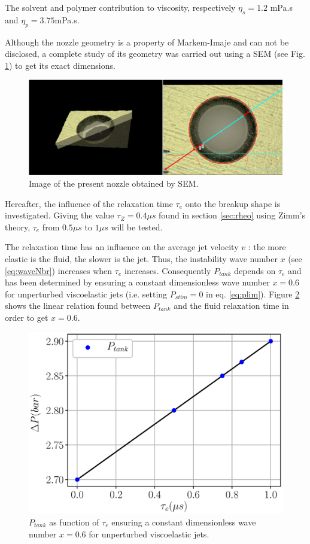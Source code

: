 \documentclass[onecolumn, 12pt]{asme2ej}
\begin{document}
The solvent and polymer contribution to viscosity, respectively $\eta_s = 1.2$ mPa.s and $\eta_p=3.75$mPa.s. 

 
Although the nozzle geometry is a property of {Markem-Imaje\textcopyright}  and can not be disclosed, a complete study of its geometry was carried out using a SEM (see Fig. \ref{fig:micro}) to get its exact dimensions.

\begin{figure}[h]
    \centering
\includegraphics[width=15cm]{Figures/Fig11.eps}
\caption{Image of the present nozzle obtained by SEM.}
\label{fig:micro}
\end{figure}
 
Hereafter, the influence of the relaxation time $\tau_e$ onto the breakup shape is investigated. Giving the value $\tau_Z= 0.4 \mu s$ found in section  \ref{sec:rheo} using Zimm's theory, $\tau_e$ from $0.5 \mu s$ to $1 \mu s$ will be tested. 

The relaxation time has an influence on the average jet velocity $v$ : the more elastic is the fluid, the slower is the jet. Thus, the instability wave number $x$ (see \ref{eq:waveNbr}) increases when $\tau_e$ increases. Consequently $P_{tank}$ depends on $\tau_e$ and has been determined by ensuring a constant dimensionless wave number $x=0.6$ for unperturbed viscoelastic jets (i.e. setting $P_{stim}=0$ in eq. \ref{eq:plim}). Figure \ref{fig:dP} shows the linear relation found between $P_{tank}$ and the fluid relaxation time in order to get $x=0.6$.

\begin{figure}[H]
    \centering
    \includegraphics[width=15cm]{Figures/Fig12.eps}
    \caption{$P_{tank}$ as function of $\tau_e$ ensuring a constant dimensionless wave number $x = 0.6$ for unperturbed viscoelastic jets.}
    \label{fig:dP}
\end{figure}
\end{document}
